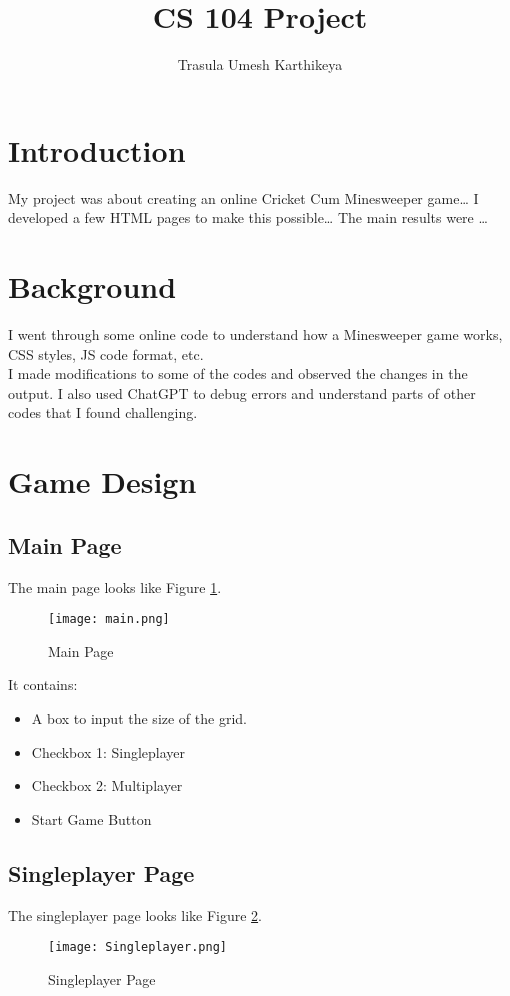 \documentclass[a4paper, 11pt]{article}
\title{CS 104 Project}
\author{Trasula Umesh Karthikeya}
\begin{document}
\maketitle
\tableofcontents
\pagebreak

\section{Introduction}
My project was about creating an online Cricket Cum Minesweeper game\ldots
I developed a few HTML pages to make this possible\ldots
The main results were \ldots

\section{Background}
I went through some online code to understand how a Minesweeper game works, CSS styles, JS code format, etc. \\
I made modifications to some of the codes and observed the changes in the output. I also used ChatGPT to debug errors and understand parts of other codes that I found challenging.

\section{Game Design}
\subsection{Main Page}
The main page looks like Figure \ref{fig:main-page}.
\begin{figure}[h!]
    \centering
    \texttt{[image: main.png]}
    \caption{Main Page}
    \label{fig:main-page}
\end{figure}

It contains:
\begin{itemize}
    \item A box to input the size of the grid.
    \item Checkbox 1: Singleplayer
    \item Checkbox 2: Multiplayer
    \item Start Game Button
\end{itemize}

\subsection{Singleplayer Page}
The singleplayer page looks like Figure \ref{fig:singleplayer-page}.
\begin{figure}[h!]
    \centering
    \texttt{[image: Singleplayer.png]}
    \caption{Singleplayer Page}
    \label{fig:singleplayer-page}
\end{figure}
\end{document}
